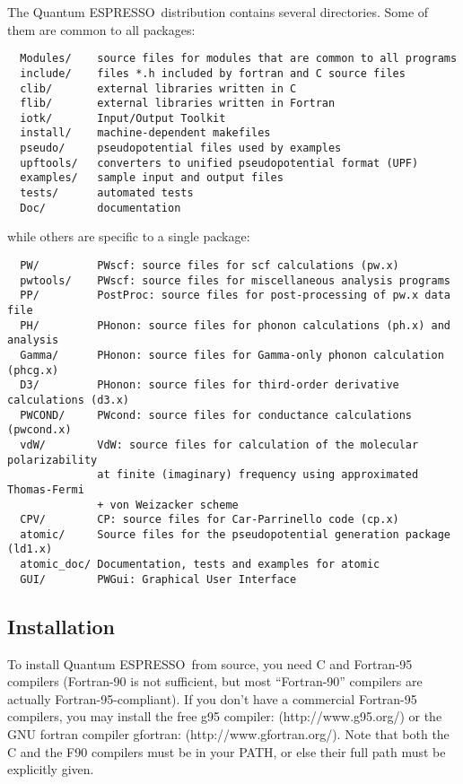 \documentclass[12pt,a4paper]{article}
\def\qe{{\sc Quantum ESPRESSO}}
\begin{document}
The \qe\ distribution contains several directories. Some of them are
common to all packages:
\begin{verbatim}
  Modules/    source files for modules that are common to all programs
  include/    files *.h included by fortran and C source files
  clib/       external libraries written in C
  flib/       external libraries written in Fortran
  iotk/       Input/Output Toolkit
  install/    machine-dependent makefiles
  pseudo/     pseudopotential files used by examples
  upftools/   converters to unified pseudopotential format (UPF)
  examples/   sample input and output files
  tests/      automated tests
  Doc/        documentation
\end{verbatim}
while others are specific to a single package:
\begin{verbatim}
  PW/         PWscf: source files for scf calculations (pw.x)
  pwtools/    PWscf: source files for miscellaneous analysis programs
  PP/         PostProc: source files for post-processing of pw.x data file
  PH/         PHonon: source files for phonon calculations (ph.x) and analysis
  Gamma/      PHonon: source files for Gamma-only phonon calculation (phcg.x)
  D3/         PHonon: source files for third-order derivative calculations (d3.x)
  PWCOND/     PWcond: source files for conductance calculations (pwcond.x)
  vdW/        VdW: source files for calculation of the molecular polarizability
              at finite (imaginary) frequency using approximated Thomas-Fermi
              + von Weizacker scheme
  CPV/        CP: source files for Car-Parrinello code (cp.x)
  atomic/     Source files for the pseudopotential generation package (ld1.x)
  atomic_doc/ Documentation, tests and examples for atomic
  GUI/        PWGui: Graphical User Interface
\end{verbatim}

\subsection{Installation}
\label{Sec:Installation}

To install \qe\ from source, you need C and Fortran-95
compilers (Fortran-90 is not sufficient, but most ``Fortran-90''
compilers are actually Fortran-95-compliant). If you don't have a
commercial Fortran-95 
compilers, you may install the free g95 compiler: (http://www.g95.org/) or
the GNU fortran compiler gfortran: (http://www.gfortran.org/).
Note that both the C and the F90 compilers must be in your PATH, or else
their full path must be explicitly given.
\end{document}
